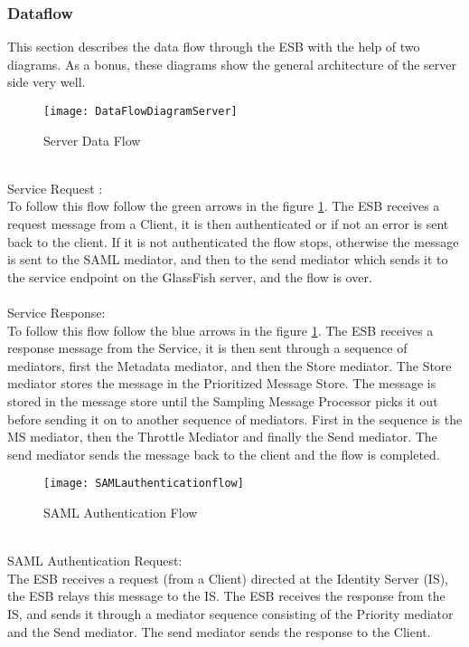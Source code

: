     \subsubsection{Dataflow}\label{Textual Server Dataflow} 
        This section describes the data flow through the ESB with the help of two diagrams. As a bonus, these diagrams show the general architecture of the server side very well.
\\
        \begin{figure}[h]
            \centering
            \texttt{[image: DataFlowDiagramServer]}
            \caption{Server Data Flow}
            \label{fig:DataFlowDiagramServer}
        \end{figure}
\\
Service Request :\\
To follow this flow follow the green arrows in the figure \ref{fig:DataFlowDiagramServer}. The ESB receives a request message from a Client, it is then authenticated or if not an error is sent back to the client. If it is not authenticated the flow stops, otherwise the message is sent to the SAML mediator, and then to the send mediator which sends it to the service endpoint on the GlassFish server, and the flow is over.
\\\\
Service Response:\\
To follow this flow follow the blue arrows in the figure \ref{fig:DataFlowDiagramServer}. The ESB receives a response message from the Service, it is then sent through a sequence of mediators, first the Metadata mediator, and then  the Store mediator. The Store mediator stores the message in the Prioritized Message Store. The message is stored in the message store until the Sampling Message Processor picks it out before sending it on to another sequence of mediators. First in the sequence is the MS mediator, then the Throttle Mediator and finally the Send mediator. The send mediator sends the message back to the client and the flow is completed.
\\
    \begin{figure}[h]
        \centering
        \texttt{[image: SAMLauthenticationflow]}
        \caption{SAML Authentication Flow}
        \label{fig:SAMLauthenticationflow}
    \end{figure}
\\           
SAML Authentication Request:\\
The ESB receives a request (from a Client) directed at the Identity Server (IS), the ESB relays this message to the IS. The ESB receives the response from the IS, and sends it through a mediator sequence consisting of the Priority mediator and the Send mediator. The send mediator sends the response to the Client.

